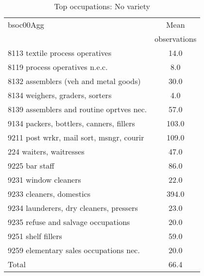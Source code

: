 \begin{table}
	\centering
	\caption{Top occupations: No variety}
	\begin{tabular}{lc}
	\toprule	
		
bsoc00Agg&Mean \\
&observations \\
\hline
8113 textile process operatives&14.0 \\
8119 process operatives n.e.c.&8.0 \\
8132 assemblers (veh and metal goods)&30.0 \\
8134 weighers, graders, sorters&4.0 \\
8139 assemblers and routine oprtves nec.&57.0 \\
9134 packers, bottlers, canners, fillers&103.0 \\
9211 post wrkr, mail sort, msngr, courir&109.0 \\
224 waiters, waitresses&47.0 \\
9225 bar staff&86.0 \\
9231 window cleaners&22.0 \\
9233 cleaners, domestics&394.0 \\
9234 launderers, dry cleaners, pressers&23.0 \\
9235 refuse and salvage occupations&20.0 \\
9251 shelf fillers&59.0 \\
9259 elementary sales occupations nec.&20.0 \\
Total&66.4 \\
\bottomrule
\bottomrule
\end{tabular}
\end{table}
